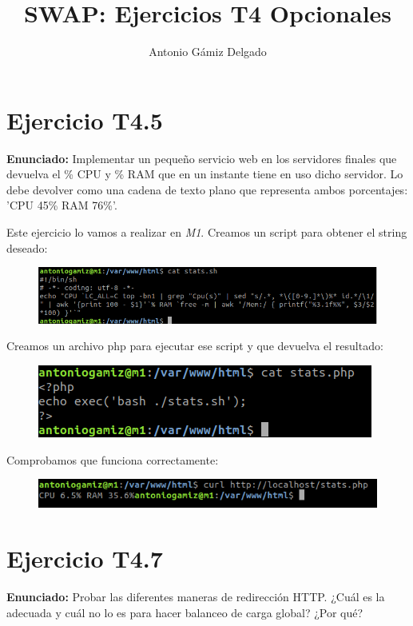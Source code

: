 \documentclass[12pt]{article}
\begin{document}
\title{SWAP: Ejercicios T4 Opcionales}
\author{
        Antonio Gámiz Delgado
}
\maketitle
\medskip

\section{Ejercicio T4.5}
\textbf{Enunciado:} Implementar un pequeño servicio web en los servidores finales que devuelva el \% CPU y \% RAM que en un instante tiene en uso dicho servidor. Lo debe devolver como una cadena de texto plano que representa ambos porcentajes: 'CPU 45\% RAM 76\%'.

Este ejercicio lo vamos a realizar en \textit{M1}. Creamos un script para obtener el string deseado:

\begin{figure}[H]
  \center
  \includegraphics[scale=0.5]{img/1.png}
\end{figure}

Creamos un archivo php para ejecutar ese script y que devuelva el resultado:

\begin{figure}[H]
  \center
  \includegraphics[scale=0.5]{img/2.png}
\end{figure}

Comprobamos que funciona correctamente:

\begin{figure}[H]
  \center
  \includegraphics[scale=0.5]{img/3.png}
\end{figure}

\newpage

\section{Ejercicio T4.7}
\textbf{Enunciado:} Probar las diferentes maneras de redirección HTTP. ¿Cuál es la adecuada y cuál no lo es para hacer balanceo de carga global? ¿Por qué?
\end{document}
